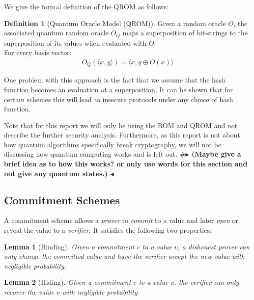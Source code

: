 \documentclass[11pt]{report}
\theoremstyle{definition}
\newtheorem{definition}{Definition}[section]
\theoremstyle{plain}
\newtheorem{lemma}{Lemma}[section]
\newcommand{\todo}[1]{{\color[rgb]{.5,0,0}\textbf{$\blacktriangleright$#1$\blacktriangleleft$}}}
\begin{document}
We give the formal definition of the QROM as follows:
\begin{definition}[Quantum Oracle Model (QROM)]
  Given a random oracle $O$, the associated quantum random oracle $O_Q$ maps a superposition of bit-strings to the superposition of its values when evaluated with $O$.\\
  For every basis vector:
  \begin{align}
    O_Q(\langle x,y \rangle) = \langle x,y \oplus O(x) \rangle
  \end{align}
\end{definition}
One problem with this approach is the fact that we assume that the hash function becomes an evaluation at a superposition. It can be shown that for certain schemes this will lead to insecure protocols under any choice of hash function.

Note that for this report we will only be using the ROM and QROM and not describe the further security analysis. Furthermore, as this report is not about how quantum algorithms specifically break cryptography, we will not be discussing how qunatum computing works and is left out.
#\todo{ (Maybe give a brief idea as to how this works? or only use words for this section and not give any quantum states.) }

\subsection{Commitment Schemes}
A commitment scheme allows a \textit{prover} to \textit{commit} to a value and later \textit{open} or reveal the value to a \textit{verifier}. It satisfies the following two properties:

\begin{lemma}[Binding]\label{lem:binding}
  Given a commitment $c$ to a value $v$, a dishonest prover can only change the committed value and have the verifier accept the new value with negligible probability.
\end{lemma}
\begin{lemma}[Hiding]\label{lem:hiding}
  Given a commitment $c$ to a value $v$, the verifier can only recover the value $v$ with negligible probability.
\end{lemma}
\end{document}
